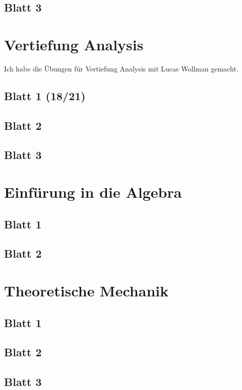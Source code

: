 \documentclass{tuftebook}
\numberwithin{Theorem}{chapter}
\theoremstyle{definition}
\theoremstyle{definition}
\begin{document}
\section{Blatt 3}


\chapter{Vertiefung Analysis}
Ich habe die Übungen für Vertiefung Analysis mit Lucas Wollman gemacht.
\section{Blatt 1 (18/21)}

\section{Blatt 2}

\section{Blatt 3}


\chapter{Einf\"{u}rung in die Algebra}
\section{Blatt 1}

\section{Blatt 2}


\chapter{Theoretische Mechanik}
\section{Blatt 1}

\section{Blatt 2}

\section{Blatt 3}

\end{document}
